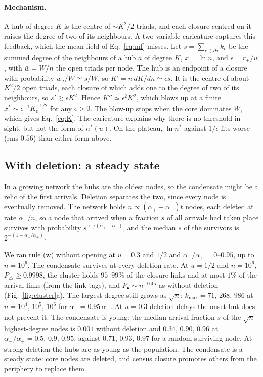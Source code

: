 \documentclass[aps,pre,twocolumn,superscriptaddress,floatfix,nofootinbib]{revtex4-2}
\begin{document}
\paragraph*{Mechanism.}
A hub of degree $K$ is the centre of $\sim K^2/2$ triads, and each closure
centred on it raises the degree of two of its neighbours. A two-variable
caricature captures this feedback, which the mean field of Eq.~\eqref{eq:mf}
misses. Let $s=\sum_{c\in\partial a}k_c$ be the summed degree
of the neighbours of a hub $a$ of degree $K$, $x=\ln n$, and
$\epsilon=r_+/\bar w$, with $\bar w=W/n$ the open triads per node. The hub is an
endpoint of a closure with probability $w_a/W\simeq s/W$, so
$K'=n\,dK/dn\simeq\epsilon s$. It is the centre of about $K^2/2$ open triads,
each closure of which adds one to the degree of two of its neighbours, so
$s'\gtrsim\epsilon K^2$. Hence $K''\simeq\epsilon^2K^2$, which blows up at a
finite $x^*\sim\epsilon^{-1}K_0^{-1/2}$ for any $\epsilon>0$. The blow-up stops
when the core dominates $W$, which gives Eq.~\eqref{eq:K}. The caricature
explains why there is no threshold in sight, but not the form of $n^*(u)$. On
the plateau, $\ln n^*$ against $1/\epsilon$ fits worse (rms $0.56$) than either
form above.

\subsection{With deletion: a steady state}
\label{sec:deletion}

In a growing network the hubs are the oldest nodes, so the condensate might be a
relic of the first arrivals. Deletion separates the two, since every node is
eventually removed. The network holds $n\propto(\alpha_+-\alpha_-)t$ nodes,
each deleted at rate $\alpha_-/n$, so a node that arrived when a fraction $s$
of all arrivals had taken place survives with probability
$s^{\alpha_-/(\alpha_+-\alpha_-)}$, and the median $s$ of the survivors is
$2^{-(1-\alpha_-/\alpha_+)}$.

We ran rule (w) without opening at $u=0.3$ and $1/2$ and
$\alpha_-/\alpha_+=0$--$0.95$, up to $n=10^6$. The condensate survives at every
deletion rate. At $u=1/2$ and $n=10^6$, $P_\triangle\ge0.9998$, the cluster
holds $95$--$99\%$ of the closure links and at most $1\%$ of the arrival links
(from the link tags), and
$P_\bullet\sim n^{-0.45}$ as without deletion (Fig.~\ref{fig:cluster}a). The
largest degree still grows as $\sqrt n$: $k_{\max}=71$, $268$, $986$ at
$n=10^4$, $10^5$, $10^6$ for $\alpha_-=0.95\,\alpha_+$. At $u=0.3$ deletion
delays the onset but does not prevent it. The condensate is young: the median
arrival fraction $s$ of the $\sqrt n$ highest-degree nodes is $0.001$ without
deletion and $0.34$, $0.90$, $0.96$ at $\alpha_-/\alpha_+=0.5$, $0.9$, $0.95$,
against $0.71$, $0.93$, $0.97$ for a random surviving node. At strong deletion
the hubs are as young as the population. The condensate is a steady state:
core nodes are deleted, and census closure promotes others from the periphery
to replace them.
\end{document}
